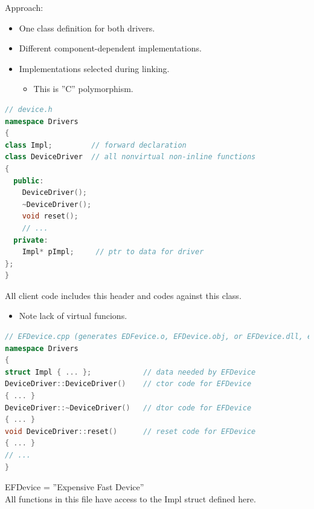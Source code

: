 Approach:
\begin{itemize}
  \item One class definition for both drivers.
  \item Different component-dependent implementations.
  \item Implementations selected during linking.
  \begin{itemize}
    \item This is ''C'' polymorphism.
  \end{itemize}
\end{itemize}
\begin{lstlisting}[language=C++]
// device.h
namespace Drivers
{
class Impl;         // forward declaration
class DeviceDriver  // all nonvirtual non-inline functions
{
  public:
    DeviceDriver();
    ~DeviceDriver();
    void reset();
    // ...
  private:
    Impl* pImpl;     // ptr to data for driver
};
}
\end{lstlisting}
All client code includes this header and codes against this class.
\begin{itemize}
  \item Note lack of virtual funcions.
\end{itemize}
\begin{lstlisting}[language=C++]
// EFDevice.cpp (generates EDFevice.o, EFDevice.obj, or EFDevice.dll, etc.)
namespace Drivers
{
struct Impl { ... };            // data needed by EFDevice
DeviceDriver::DeviceDriver()    // ctor code for EFDevice
{ ... }
DeviceDriver::~DeviceDriver()   // dtor code for EFDevice
{ ... }
void DeviceDriver::reset()      // reset code for EFDevice
{ ... }
// ...
}
\end{lstlisting}
EFDevice = ''Expensive Fast Device''\\
All functions in this file have access to the Impl struct defined here.

